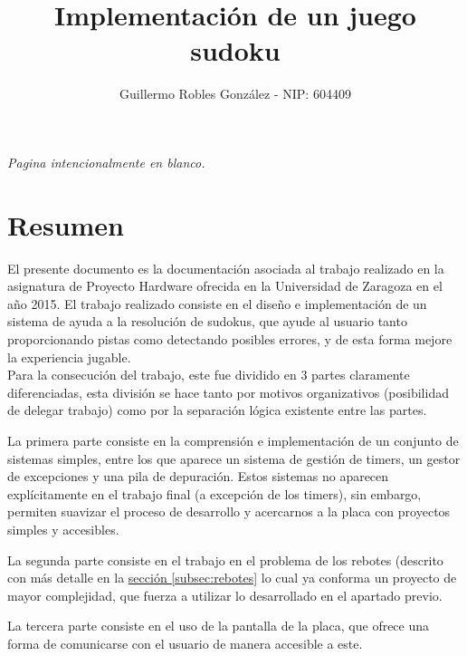 \documentclass[12pt,letterpaper]{article}
\title{Implementación de un juego sudoku} %
\author{Guillermo Robles González - NIP: 604409}
\newcommand*{\blankpage}[1]{%
  \vspace*{\fill}
  \begin{center} \textit{#1} \end{center}
  \vspace{\fill}
  \clearpage}
\newcommand*{\iref}[2]{
  \hyperref[#1]{#2
  \ref*{#1}}
  }
\begin{document}
\shorthandoff{>}
\shorthandoff{<}
\thispagestyle{empty}
\maketitle
\thispagestyle{empty}
\blankpage{Pagina intencionalmente en blanco.}
\thispagestyle{empty}
\tableofcontents
\clearpage
{}

\section{Resumen}
\label{sec:resumen}

El presente documento es la documentación asociada al trabajo realizado
en la asignatura de Proyecto Hardware ofrecida en la Universidad de
Zaragoza en el año 2015. El trabajo realizado consiste en el diseño e
implementación de un sistema de ayuda a la resolución de sudokus, que
ayude al usuario tanto proporcionando pistas como detectando posibles
errores, y de esta forma mejore la experiencia jugable.\\

Para la consecución del trabajo, este fue dividido en 3 partes
claramente diferenciadas, esta división se hace tanto por motivos
organizativos (posibilidad de delegar trabajo) como por la separación
lógica existente entre las partes.

La primera parte consiste en la comprensión e implementación de un
conjunto de sistemas simples, entre los que aparece un sistema de
gestión de timers, un gestor de excepciones y una pila de
depuración. Estos sistemas no aparecen explícitamente en el trabajo
final (a excepción de los timers), sin embargo, permiten suavizar el
proceso de desarrollo y acercarnos a la placa con proyectos simples y
accesibles.

La segunda parte consiste en el trabajo en el problema de los rebotes
(descrito con más detalle en la \iref{subsec:rebotes}{sección} lo cual
ya conforma un proyecto de mayor complejidad, que fuerza a utilizar lo
desarrollado en el apartado previo.

La tercera parte consiste en el uso de la pantalla de la placa, que
ofrece una forma de comunicarse con el usuario de manera accesible a
este.
\end{document}
